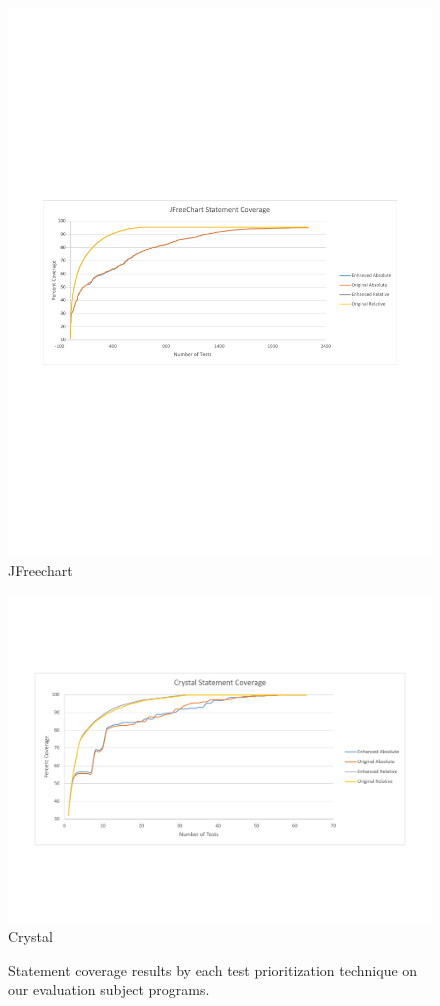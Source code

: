 \begin{figure}[t]
\begin{minipage}[b]{\linewidth}
\includegraphics[scale=0.46]{jfreechart-coverage-figure}
JFreechart
\end{minipage}
\begin{minipage}[b]{\linewidth}
\centering
\includegraphics[scale=0.35]{crystal-coverage-figure}
{Crystal}
\end{minipage}
\vspace{-6mm}
\caption{
    \label{fig:results}
Statement coverage results by each test prioritization technique on
our evaluation subject programs.  }
\end{figure}




